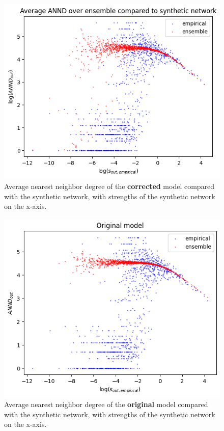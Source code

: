 \documentclass{article}
\begin{document}
\begin{figure}[!ht]
    \centering
    \includegraphics[scale=0.4]{img/metropolis/corrected model/annd_vs_s.png}
    \caption{Average nearest neighbor degree of the \textbf{corrected} model compared with the synthetic network, with strengths of the synthetic network on the x-axis.}
\end{figure}\begin{figure}[!ht]
    \centering
    \includegraphics[scale=0.4]{img/metropolis/vanilla model/annd_vs_s.png}
    \caption{Average nearest neighbor degree of the \textbf{original} model compared with the synthetic network, with strengths of the synthetic network on the x-axis.}
\end{figure}
\end{document}
